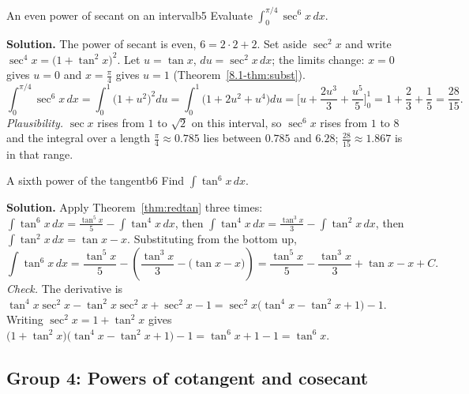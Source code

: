 \documentclass[11pt]{article}
\begin{document}
\begin{exmp}{An even power of secant on an interval}{b5}
Evaluate $\displaystyle\int_0^{\pi/4}\sec^6x\,dx$.

\textbf{Solution.} The power of secant is even, $6=2\cdot2+2$. Set aside $\sec^2x$ and write $\sec^4x=\big(1+\tan^2x\big)^2$. Let $u=\tan x$, $du=\sec^2x\,dx$; the limits change: $x=0$ gives $u=0$ and $x=\frac\pi4$ gives $u=1$ (Theorem~\ref{8.1-thm:subst}).
\[\int_0^{\pi/4}\sec^6x\,dx=\int_0^1\big(1+u^2\big)^2du=\int_0^1\big(1+2u^2+u^4\big)du=\Big[u+\frac{2u^3}3+\frac{u^5}5\Big]_0^1=1+\frac23+\frac15=\frac{28}{15} .\]
\emph{Plausibility.} $\sec x$ rises from $1$ to $\sqrt2$ on this interval, so $\sec^6x$ rises from $1$ to $8$ and the integral over a length $\frac\pi4\approx0.785$ lies between $0.785$ and $6.28$; $\frac{28}{15}\approx1.867$ is in that range.
\end{exmp}

\begin{exmp}{A sixth power of the tangent}{b6}
Find $\int\tan^6x\,dx$.

\textbf{Solution.} Apply Theorem~\ref{thm:redtan} three times: $\int\tan^6x\,dx=\frac{\tan^5x}5-\int\tan^4x\,dx$, then $\int\tan^4x\,dx=\frac{\tan^3x}3-\int\tan^2x\,dx$, then $\int\tan^2x\,dx=\tan x-x$. Substituting from the bottom up,
\[\int\tan^6x\,dx=\frac{\tan^5x}5-\left(\frac{\tan^3x}3-\big(\tan x-x\big)\right)=\frac{\tan^5x}5-\frac{\tan^3x}3+\tan x-x+C .\]
\emph{Check.} The derivative is $\tan^4x\sec^2x-\tan^2x\sec^2x+\sec^2x-1=\sec^2x\big(\tan^4x-\tan^2x+1\big)-1$. Writing $\sec^2x=1+\tan^2x$ gives $\big(1+\tan^2x\big)\big(\tan^4x-\tan^2x+1\big)-1=\tan^6x+1-1=\tan^6x$.
\end{exmp}

\subsection*{Group 4: Powers of cotangent and cosecant}
\end{document}
